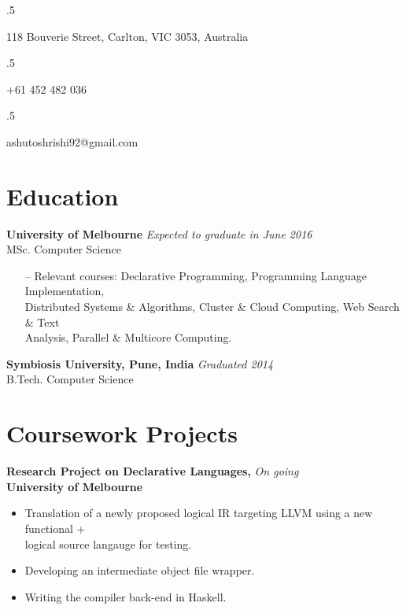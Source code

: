 \documentclass[a4paper,overlapped]{res}
\begin{document}


\begin{resume}
  \moveleft.5\hoffset\centerline{118 Bouverie Street, Carlton, VIC 3053, Australia}
  \moveleft.5\hoffset\centerline{+61 452 482 036}
  \moveleft.5\hoffset\centerline{ashutoshrishi92@gmail.com}

  \section{Education}  
  \textbf{University of Melbourne} \hfill \textit{Expected to graduate in June 2016} \\
  MSc. Computer Science 
  \begin{itemize} \itemsep -2pt
  \item[--] Relevant courses: Declarative Programming, 
    Programming Language Implementation, \\ Distributed Systems \&
    Algorithms, Cluster \& Cloud Computing, Web Search \& Text \\ 
    Analysis, Parallel \& Multicore Computing.
  \end{itemize}

  \textbf{Symbiosis University, Pune, India} \hfill \textit{Graduated 2014} \\
  B.Tech. Computer Science 


  \section{Coursework Projects}
  
  \textbf{Research Project on Declarative Languages,} \hfill \textit{On going}\\
  \textbf{University of Melbourne}
  \begin{itemize}
  \item Translation of a newly proposed logical IR targeting LLVM using a new
    functional + \\ logical source langauge for testing.
  \item Developing an intermediate object file wrapper.
  \item Writing the compiler back-end in Haskell.
  \end{itemize}


\end{resume}
\end{document}
